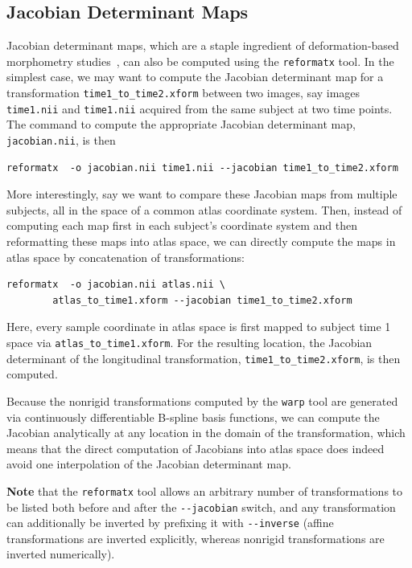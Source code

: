 \documentclass{InsightArticle}
\begin{document}
\subsection{Jacobian Determinant Maps}

Jacobian determinant maps, which are a staple ingredient of deformation-based
morphometry studies~\cite{AshbHuttFrac:1998}, can also be computed using the
\verb|reformatx| tool. In the simplest case, we may want to compute the
Jacobian determinant map for a transformation \verb|time1_to_time2.xform|
between two images, say images \verb|time1.nii| and \verb|time1.nii| acquired
from the same subject at two time points. The command to compute the
appropriate Jacobian determinant map, \verb|jacobian.nii|, is then
\begin{verbatim}
reformatx  -o jacobian.nii time1.nii --jacobian time1_to_time2.xform
\end{verbatim}
More interestingly, say we want to compare these Jacobian maps from multiple
subjects, all in the space of a common atlas coordinate system. Then, instead
of computing each map first in each subject's coordinate system and then
reformatting these maps into atlas space, we can directly compute the maps in
atlas space by concatenation of transformations:
\begin{verbatim}
reformatx  -o jacobian.nii atlas.nii \
        atlas_to_time1.xform --jacobian time1_to_time2.xform
\end{verbatim}
Here, every sample coordinate in atlas space is first mapped to subject time 1
space via \verb|atlas_to_time1.xform|. For the resulting location, the
Jacobian determinant of the longitudinal transformation,
\verb|time1_to_time2.xform|, is then computed.

Because the nonrigid transformations computed by the \verb|warp| tool are
generated via continuously differentiable B-spline basis functions, we can
compute the Jacobian analytically at any location in the domain of the
transformation, which means that the direct computation of Jacobians into
atlas space does indeed avoid one interpolation of the Jacobian determinant
map.

{\bf Note} that the \verb|reformatx| tool allows an arbitrary number of
transformations to be listed both before and after the \verb|--jacobian|
switch, and any transformation can additionally be inverted by prefixing it
with \verb|--inverse| (affine transformations are inverted explicitly, whereas
nonrigid transformations are inverted numerically). 
\end{document}

